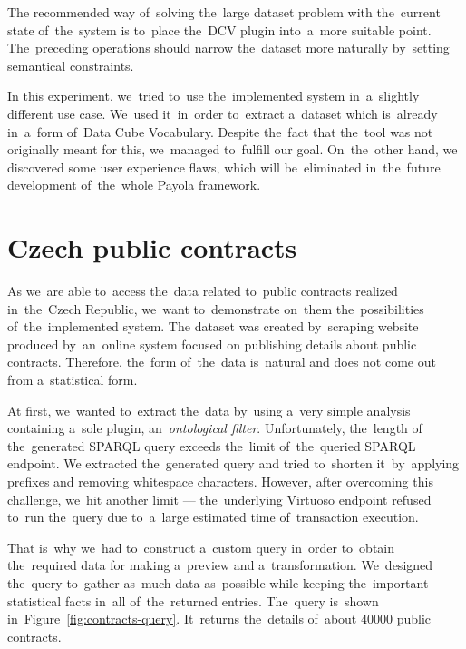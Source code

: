 The recommended way of~solving the~large dataset problem with the~current state of~the~system
is to~place the~DCV 
plugin into~a~more suitable point. The~preceding operations should narrow the~dataset more naturally by~setting semantical constraints.

In this experiment, we~tried to~use the~implemented system in~a~slightly 
different use case. We~used it~in~order to~extract a~dataset which is~already in~a~form of~Data Cube Vocabulary. Despite the~fact that the~tool was not 
originally meant for this, we~managed to~fulfill our goal. On~the~other hand, 
we discovered some user experience flaws, which will be~eliminated in~the~future 
development of~the~whole Payola framework.

\section{Czech public contracts}
As we~are able to~access the~data related to~public contracts realized in~the~Czech Republic, we~want to~demonstrate on~them the~possibilities of~the~implemented system.
The dataset was created by~scraping website produced by~an~online system focused 
on publishing details about public contracts. Therefore, the~form of~the~data is~natural and does not come out from a~statistical form.

At first, we~wanted to~extract the~data by~using a~very simple analysis
containing a~sole plugin, an~\emph{ontological filter}. Unfortunately, the~length
of the~generated SPARQL query exceeds the~limit of~the~queried SPARQL endpoint.
We extracted the~generated query and tried to~shorten it~by~applying prefixes 
and removing whitespace characters. However, after overcoming this challenge, we~hit another limit --- the~underlying Virtuoso endpoint refused to~run the~query 
due to~a~large estimated time of~transaction execution.

That is~why we~had to~construct a~custom query in~order to~obtain the~required 
data for making a~preview and a~transformation. We~designed the~query to~gather as~much data as~possible while keeping the~important statistical facts in~all of~the~returned entries. The~query is~shown in~Figure~\ref{fig:contracts-query}. It~returns the~details of~about $40000$ public 
contracts.

